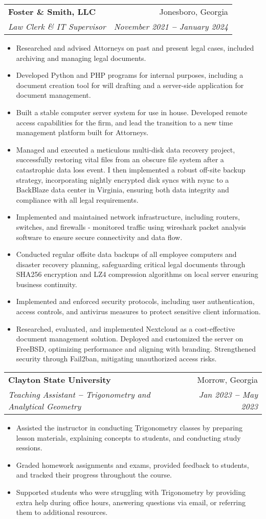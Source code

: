 \documentclass[letterpaper,11pt]{article}
\makeatletter
\newcommand{\resumeItem}[1]{
  \item\small{
    {#1 \vspace{-2pt}}
  }
}
\newcommand{\resumeSubheading}[4]{
  \vspace{-2pt}\item
    \begin{tabular*}{0.97\textwidth}[t]{l@{\extracolsep{\fill}}r}
      \textbf{#1} & #2 \\
      \textit{\small#3} & \textit{\small #4} \\
    \end{tabular*}\vspace{-7pt}
}
\newcommand{\resumeItemListStart}{\begin{itemize}}
\newcommand{\resumeItemListEnd}{\end{itemize}\vspace{-5pt}}
\makeatother
\begin{document}
    \resumeSubheading
      {Foster \& Smith, LLC}{Jonesboro, Georgia}
      {Law Clerk \& IT Supervisor}{November 2021 \textbf{--} January 2024}
        \resumeItemListStart
            \resumeItem{Researched and advised Attorneys on past and present legal cases, included archiving and managing legal documents.}
            \resumeItem{Developed Python and PHP programs for internal purposes, including a document creation tool for will drafting and a server-side application for document management.}
            \resumeItem{Built a stable computer server system for use in house. Developed remote access capabilities for the firm, and lead the transition to a new time management platform built for Attorneys.}
            \resumeItem{Managed and executed a meticulous multi-disk data recovery project, successfully restoring vital files from an obscure file system after a catastrophic data loss event. I then implemented a robust off-site backup strategy, incorporating nightly encrypted disk syncs with rsync to a BackBlaze data center in Virginia, ensuring both data integrity and compliance with all legal requirements.}
            \resumeItem{Implemented and maintained network infrastructure, including routers, switches, and firewalls - monitored traffic using wireshark packet analysis software to ensure secure connectivity and data flow.}
            \resumeItem{Conducted regular offsite data backups of all employee computers and disaster recovery planning, safeguarding critical legal documents through SHA256 encryption and LZ4 compression algorithms on local server ensuring business continuity.}
            \resumeItem{Implemented and enforced security protocols, including user authentication, access controls, and antivirus measures to protect sensitive client information.}
            \resumeItem{Researched, evaluated, and implemented Nextcloud as a cost-effective document management solution. Deployed and customized the server on FreeBSD, optimizing performance and aligning with branding. Strengthened security through Fail2ban, mitigating unauthorized access risks.}
        \resumeItemListEnd
    
    \resumeSubheading
      {Clayton State University}{Morrow, Georgia}
      {Teaching Assistant \textbf{--} Trigonometry and Analytical Geometry}{Jan 2023 \textbf{--} May 2023}
        \resumeItemListStart
            \resumeItem{Assisted the instructor in conducting Trigonometry classes by preparing lesson materials, explaining concepts to students, and conducting study sessions.}
            \resumeItem{Graded homework assignments and exams, provided feedback to students, and tracked their progress throughout the course.}
            \resumeItem{Supported students who were struggling with Trigonometry by providing extra help during office hours, answering questions via email, or referring them to additional resources.}
        \resumeItemListEnd
    
\end{document}
